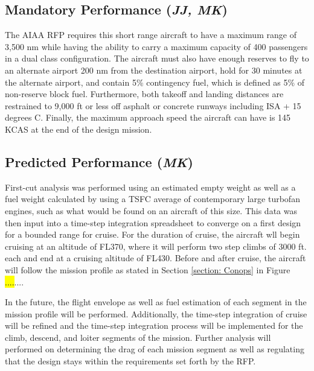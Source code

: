 
\subsection{Mandatory Performance (\textit{JJ, MK})}
The AIAA RFP \cite{RFP} requires this short range aircraft to have a maximum range of 3,500 nm while having the ability to carry a maximum capacity of 400 passengers in a dual class configuration. The aircraft must also have enough reserves to fly to an alternate airport 200 nm from the destination airport, hold for 30 minutes at the alternate airport, and contain 5\% contingency fuel, which is defined as 5\% of non-reserve block fuel. Furthermore, both takeoff and landing distances are restrained to 9,000 ft or less off asphalt or concrete runways including ISA + 15 degrees C. Finally, the maximum approach speed the aircraft can have is 145 KCAS at the end of the design mission. 

\subsection{Predicted Performance (\textit{MK})}
First-cut analysis was performed using an estimated empty weight as well as a fuel weight calculated by using a TSFC average of contemporary large turbofan engines, such as what would be found on an aircraft of this size.  This data was then input into a time-step integration spreadsheet to converge on a first design for a bounded range for cruise. For the duration of cruise, the aircraft wll begin cruising at an altitude of FL370, where it will perform two step climbs of 3000 ft. each and end at a cruising altitude of FL430. Before and after cruise, the aircraft will follow the mission profile as stated in Section \ref{section: Conops} in Figure \hl{....}....

In the future, the flight envelope as well as fuel estimation of each segment in the mission profile will be performed. Additionally, the time-step integration of cruise will be refined and the time-step integration process will be implemented for the climb, descend, and loiter segments of the mission. Further analysis will performed on determining the drag of each mission segment as well as regulating that the design stays within the requirements set forth by the RFP. 

